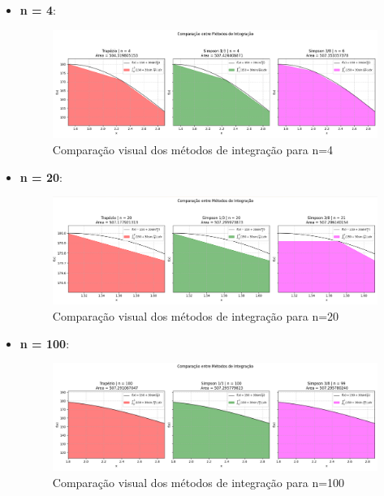 \documentclass{article}
\begin{document}
\begin{itemize}
    \item \textbf{n = 4}:
    \begin{figure}[H]
        \centering
        \includegraphics[width=1.0\textwidth, height=0.4\textheight, keepaspectratio]{n4.png}
        \caption{\small Comparação visual dos métodos de integração para n=4}\label{fig:n4}
    \end{figure}
    
    \item \textbf{n = 20}:
    \vspace{-1cm}
    \begin{figure}[H]
        \centering
        \includegraphics[width=1\textwidth, height=0.3\textheight, keepaspectratio]{n20.png}
        \caption{Comparação visual dos métodos de integração para n=20}\label{fig:n20}
    \end{figure}
    
    \item \textbf{n = 100}:
    \begin{figure}[H]
        \centering
        \includegraphics[width=1\textwidth, height=0.3\textheight, keepaspectratio]{n100.png}
        \caption{Comparação visual dos métodos de integração para n=100}\label{fig:n100}
    \end{figure}


\end{itemize}
\end{document}
